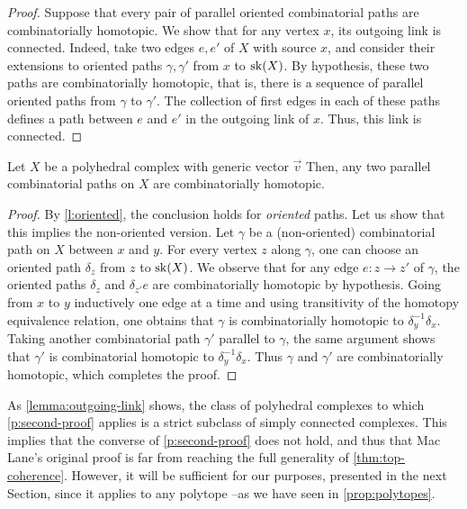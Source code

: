 \begin{proof}
    Suppose that every pair of parallel oriented combinatorial paths are combinatorially homotopic. 
    We show that for any vertex $x$, its outgoing link is  connected. 
    Indeed, take two edges $e,e'$ of $X$ with source $x$, and consider their extensions to oriented paths $\gamma, \gamma'$ from $x$ to $\mathrm{sk}(X)$. 
    By hypothesis, these two paths are combinatorially homotopic, that is, there is a sequence of parallel oriented paths from $\gamma$ to $\gamma'$. 
    The collection of first edges in each of these paths defines a path between $e$ and $e'$ in the outgoing link of $x$. 
    Thus, this link is connected. 
\end{proof}

\begin{thm}
\label{p:second-proof}
    Let $X$ be a polyhedral complex with generic vector $\vec v$ 
    Then, any two parallel combinatorial paths on $X$ are combinatorially homotopic.
\end{thm}

\begin{proof} 
    By \cref{l:oriented}, the conclusion holds for \emph{oriented} paths.  
    Let us show that this implies the non-oriented version.
    Let $\gamma$ be a (non-oriented) combinatorial path on $X$ between $x$ and $y$.
    For every vertex $z$ along $\gamma$, one can choose an oriented path $\delta_z$ from $z$ to $\mathrm{sk}(X)$. 
    We observe that for any edge $e: z \to z'$ of $\gamma$, the oriented paths $\delta_z$ and $\delta_{z'}e$ are combinatorially homotopic by hypothesis. 
    Going from $x$ to $y$ inductively one edge at a time and using transitivity of the homotopy equivalence relation, one obtains that $\gamma$ is combinatorially homotopic to $\delta_y^{-1}\delta_x$. 
    Taking another combinatorial path $\gamma'$ parallel to $\gamma$, the same argument shows that $\gamma'$ is combinatorial homotopic to $\delta_y^{-1}\delta_x$.
    Thus $\gamma$ and $\gamma'$ are combinatorially homotopic, which completes the proof. 
\end{proof}

As \cref{lemma:outgoing-link} shows, the class of polyhedral complexes to which \cref{p:second-proof} applies is a strict subclass of simply connected complexes.
This implies that the converse of \cref{p:second-proof} does not hold, and thus that Mac Lane's original proof is far from reaching the full generality of \cref{thm:top-coherence}.
However, it will be sufficient for our purposes, presented in the next Section, since it applies to any polytope --as we have seen in \cref{prop:polytopes}.


